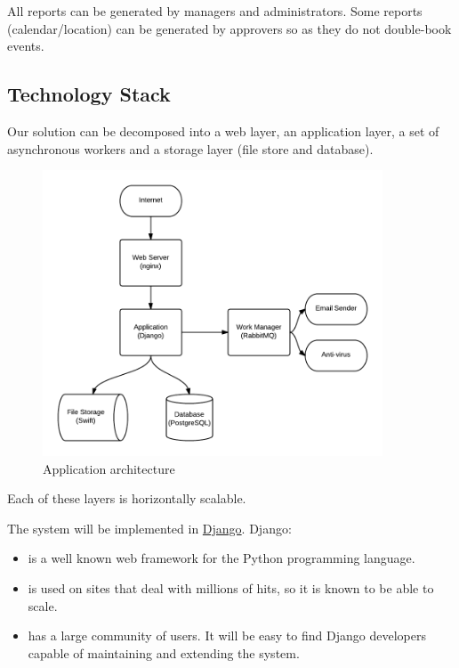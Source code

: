 \documentclass[12pt,a4paper,twosided]{article}
\begin{document}
All reports can be generated by managers and administrators. Some
reports (calendar/location) can be generated by approvers so as they do
not double-book events.

\subsection{Technology Stack}

Our solution can be decomposed into a web layer, an application layer, a
set of asynchronous workers and a storage layer (file store and
database).

\begin{figure}[htbp]
\centering
\includegraphics[width=0.9\textwidth]{./imgs/tech-overview.png}
\caption{Application architecture}
\end{figure}

Each of these layers is horizontally scalable.

The system will be implemented in \href{http://django.org}{Django}.
Django:

\begin{itemize}
\itemsep1pt\parskip0pt
\item
  is a well known web framework for the Python programming language.
\item
  is used on sites that deal with millions of hits, so it is known to be
  able to scale.
\item
  has a large community of users. It will be easy to find Django
  developers capable of maintaining and extending the system.
\end{itemize}
\end{document}
